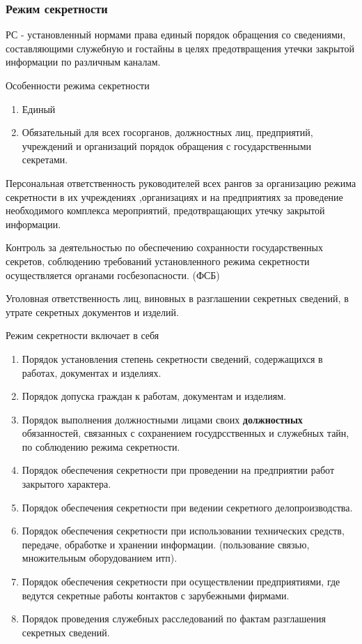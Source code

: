 \documentclass[a4paper,12pt]{report}
\begin{document}
	\subsubsection{Режим секретности}
	РС - установленный нормами права единый порядок обращения со сведениями, составляющими служебную и гостайны в целях предотвращения утечки закрытой информации по различным каналам.

	Особенности режима секретности
	\begin{enumerate}
	\item	Единый
	\item	Обязательный для всех госорганов, должностных лиц, предприятий, учреждений и организаций порядок обращения с государственными секретами.
	\end{enumerate}

	Персональная ответственность руководителей всех рангов за организацию режима секретности в их учреждениях ,организациях и на предприятиях за проведение необходимого комплекса мероприятий, предотвращающих утечку закрытой информации.

	Контроль за деятельностью по обеспечению сохранности государственных секретов, соблюдению требований установленного режима секретности осуществляется органами госбезопасности. (ФСБ)

	Уголовная ответственность лиц, виновных в разглашении секретных сведений, в утрате секретных документов и изделий.

	Режим секретности включает в себя
	\begin{enumerate}
	\item	Порядок установления степень секретности сведений, содержащихся в работах, документах и изделиях.
	\item	Порядок допуска граждан к работам, документам и изделиям.
	\item	Порядок выполнения должностными лицами своих \textbf{должностных} обязанностей, связанных с сохранением госудрсственных и служебных тайн, по соблюдению режима секретности.
	\item	Порядок обеспечения секретности при проведении на предприятии работ  закрытого характера.
	\item	Порядок обеспечения секретности при ведении секретного делопроизводства.
	\item	Порядок обеспечения секретности при использовании технических средств, передаче, обработке и хранении информации. (пользование связью, множительным оборудованием итп).
	\item	Порядок обеспечения секретности при осуществлении предприятиями, где ведутся секретные работы контактов с зарубежными фирмами.
	\item	Порядок проведения служебных расследований по фактам разглашения секретных сведений.
	\end{enumerate}
\end{document}
